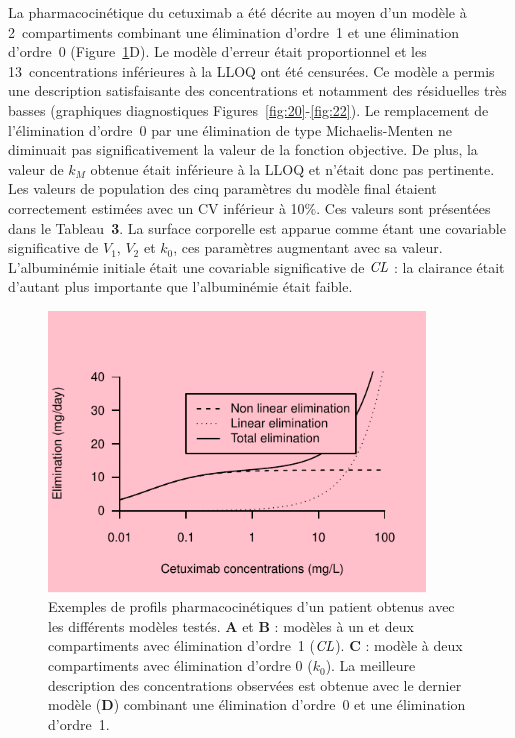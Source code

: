 La pharmacocinétique du cetuximab a été décrite au moyen d'un modèle à 2~compartiments combinant une élimination d'ordre~1 et une élimination d'ordre~0 (Figure~\ref{fig:19}D). Le modèle d'erreur était proportionnel et les 13~concentrations inférieures à la LLOQ ont été censurées. Ce modèle a permis une description satisfaisante des concentrations et notamment des résiduelles très basses (graphiques diagnostiques Figures~\ref{fig:20}-\ref{fig:22}). Le remplacement de l'élimination d'ordre~0 par une élimination de type Michaelis-Menten ne diminuait pas significativement la valeur de la fonction objective. De plus, la valeur de $k_M$ obtenue était inférieure à la LLOQ et n'était donc pas pertinente. Les valeurs de population des cinq paramètres du modèle final étaient correctement estimées avec un CV inférieur à 10\%. Ces valeurs sont présentées dans le Tableau~\textbf{3}. La surface corporelle est apparue comme étant une covariable significative de $V_1$, $V_2$ et $k_0$, ces paramètres augmentant avec sa valeur. L'albuminémie initiale était une covariable significative de $\operatorname{\textit{CL}}$ : la clairance était d'autant plus importante que l'albuminémie était faible.

\begin{figure}[htbp]
	\centering
		\includegraphics[width=10cm]{images/essai001.pdf}
	\caption[Profils PK d'un patient avec les différents modèles]{Exemples de profils pharmacocinétiques d'un patient obtenus avec les différents modèles testés. \textbf{A} et \textbf{B} : modèles à un et deux compartiments avec élimination d'ordre~1 ($\operatorname{\textit{CL}}$). \textbf{C} : modèle à deux compartiments avec élimination d'ordre 0 ($k_0$). La meilleure description des concentrations observées est obtenue avec le dernier modèle (\textbf{D}) combinant une élimination d'ordre~0 et une élimination d'ordre~1.}
	\label{fig:19}
\end{figure}

